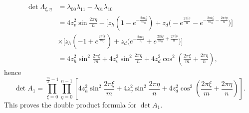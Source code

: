 \documentclass[12pt,reqno]{amsart}
\numberwithin{equation}{section}
\newcommand{\La}{\Lambda}
\newcommand{\la}{\lambda}
\begin{document}
\begin{appendix}
\begin{equation}
\begin{aligned}
\det \La_{\xi,\eta}&=\la_{00}\la_{11}-\la_{01}\la_{10}\\
&=4z_v^2 \sin\frac{2\pi \eta}{n}-
\big[z_h(1-e^{-\frac{2\pi i\xi}{m_0}})+z_d\big(-e^{\frac{2\pi i\eta}{n}}
-e^{-\frac{2\pi i\xi}{m_0}-\frac{2\pi i\eta}{n}}\big)\big]\\
&\times
\big[z_h(-1+e^{\frac{2\pi i\xi}{m_0}})+z_d\big(e^{-\frac{2\pi i\eta}{n}}
+e^{\frac{2\pi i\xi}{m_0}+\frac{2\pi i\eta}{n}}\big)\big]\\
&=4z_h^2 \sin^2\frac{2\pi \xi}{m}+4z_v^2 \sin^2\frac{2\pi \eta}{n}
+4z_d^2\cos^2\left(\frac{2\pi \xi}{m}+\frac{2\pi \eta}{n}\right),
\end{aligned}
\end{equation}
hence
\begin{equation}\label{km15}
\det A_1 =\prod_{\xi=0}^{\frac{m}{2}-1}\prod_{\eta=0}^{n-1}\left[4z_h^2 \sin^2\frac{2\pi \xi}{m}+4z_v^2 \sin^2\frac{2\pi \eta}{n}
+4z_d^2\cos^2\left(\frac{2\pi \xi}{m}+\frac{2\pi \eta}{n}\right)\right].
\end{equation}
This proves the double product formula for $\det A_1$.


\end{appendix}
\end{document}
